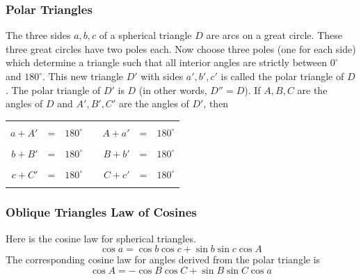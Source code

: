 \documentclass[xcolor=dvipsnames]{beamer}
\begin{document}
\begin{frame}
  \frametitle{Polar Triangles}
  The three sides $a,b,c$ of a spherical triangle $D$ are arcs on a
  great circle. These three great circles have two poles each. Now
  choose three poles (one for each side) which determine a triangle
  such that all interior angles are strictly between $0^{\circ}$ and
  $180^{\circ}$. This new triangle $D'$ with sides $a',b',c'$ is
  called the \alert{polar triangle} of $D$. The polar triangle of $D'$
  is $D$ (in other words, $D''=D$). If $A,B,C$ are the angles of $D$
  and $A',B',C'$ are the angles of $D'$, then

  \bigskip

  \begin{tabular}{|rclcrcl|}\hline
    &&&\hspace{.5in}&&& \\
    $a+A'$&=&$180^{\circ}$&&$A+a'$&=&$180^{\circ}$ \\
    &&&\hspace{.5in}&&& \\
    $b+B'$&=&$180^{\circ}$&&$B+b'$&=&$180^{\circ}$ \\
    &&&\hspace{.5in}&&& \\
    $c+C'$&=&$180^{\circ}$&&$C+c'$&=&$180^{\circ}$ \\
    &&&\hspace{.5in}&&& \\ \hline
  \end{tabular}
\end{frame}

\begin{frame}
  \frametitle{Oblique Triangles Law of Cosines}
  Here is the cosine law for spherical triangles.
\begin{equation}
  \label{eq:epheepee}
  \cos{}a=\cos{}b\cos{}c+\sin{}b\sin{}c\cos{}A
\end{equation}
The corresponding cosine law for angles derived from the polar
triangle is
\begin{equation}
  \label{eq:dijeeghe}
  \cos{}A=-\cos{}B\cos{}C+\sin{}B\sin{}C\cos{}a
\end{equation}
\end{frame}
\end{document}
